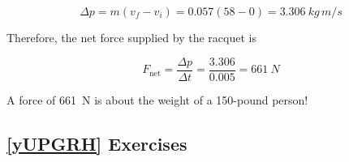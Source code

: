 \documentclass{article}
\numberwithin{equation}{section}
\numberwithin{figure}{section}
\begin{document}
\begin{equation*}
    \Delta p = m(v_f - v_i) = 0.057(58 - 0) = \SI{3.306}{kg\,m/s}
\end{equation*}

Therefore, the net force supplied by the racquet is

\begin{equation*}
    F_{\text{net}} = \frac{\Delta p}{\Delta t} = \frac{3.306}{0.005} = \SI{661}{N}
\end{equation*}
\vspace{0.1ex}

A force of \SI{661}{N} is about the weight of a 150-pound person!

\subsection*{\ref{yUPGRH} Exercises}
\end{document}
